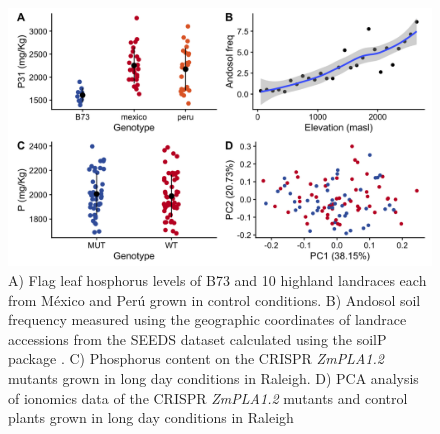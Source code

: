 \documentclass[9pt,twocolumn,twoside,lineno]{BioRxiv}
\begin{document}
\begin{figure}[t]
\begin{center}
\includegraphics[width=0.8\paperwidth]{Sup_Figures/Sup_Fig_8.png}
\caption{A) Flag leaf hosphorus levels of B73 and 10 highland landraces each from México and Perú grown in control conditions.
B) Andosol soil frequency measured using the geographic coordinates of landrace accessions from the SEEDS dataset calculated using the soilP package \cite{Rodriguez-Zapata2018-vz}.
C) Phosphorus content on the CRISPR \textit{ZmPLA1.2} mutants grown in long day conditions in Raleigh.
D) PCA analysis of ionomics data of the CRISPR \textit{ZmPLA1.2} mutants and control plants grown in long day conditions in Raleigh
}
\label{SupFig8}
\end{center}
\end{figure} 
\end{document}
